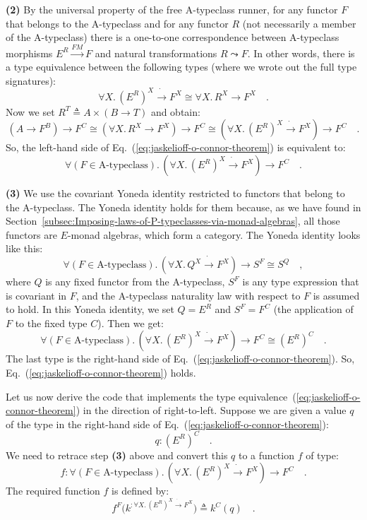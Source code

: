 \textbf{(2)} By the universal property of the free A-typeclass runner,
for any functor $F$ that belongs to the A-typeclass and for any functor
$R$ (not necessarily a member of the A-typeclass) there is a one-to-one
correspondence between A-typeclass morphisms $E^{R}\overset{FM}{\rightarrow}F$
and natural transformations $R\leadsto F$. In other words, there
is a type equivalence between the following types (where we wrote
out the full type signatures): 
\[
\forall X.\,(E^{R})^{X}\dot{\rightarrow}F^{X}\cong\forall X.\,R^{X}\rightarrow F^{X}\quad.
\]
Now we set $R^{T}\triangleq A\times(B\rightarrow T)$ and obtain:
\[
(A\rightarrow F^{B})\rightarrow F^{C}\cong(\forall X.\,R^{X}\rightarrow F^{X})\rightarrow F^{C}\cong(\forall X.\,(E^{R})^{X}\dot{\rightarrow}F^{X})\rightarrow F^{C}\quad.
\]
So, the left-hand side of Eq.~(\ref{eq:jaskelioff-o-connor-theorem})
is equivalent to:
\[
\forall(F\in\text{A-typeclass}).\,(\forall X.\,(E^{R})^{X}\dot{\rightarrow}F^{X})\rightarrow F^{C}\quad.
\]

\textbf{(3)} We use the covariant Yoneda identity restricted to functors
that belong to the A-typeclass. The Yoneda identity holds for them
because, as we have found in Section~\ref{subsec:Imposing-laws-of-P-typeclasses-via-monad-algebras},
all those functors are $E$-monad algebras, which form a category.
The Yoneda identity looks like this:
\[
\forall(F\in\text{A-typeclass}).\,(\forall X.\,Q^{X}\dot{\rightarrow}F^{X})\rightarrow S^{F}\cong S^{Q}\quad,
\]
where $Q$ is any fixed functor from the A-typeclass, $S^{F}$ is
any type expression that is covariant in $F$, and the A-typeclass
naturality law with respect to $F$ is assumed to hold. In this Yoneda
identity, we set $Q=E^{R}$ and $S^{F}=F^{C}$ (the application of
$F$ to the fixed type $C$). Then we get:
\[
\forall(F\in\text{A-typeclass}).\,(\forall X.\,(E^{R})^{X}\dot{\rightarrow}F^{X})\rightarrow F^{C}\cong(E^{R})^{C}\quad.
\]
The last type is the right-hand side of Eq.~(\ref{eq:jaskelioff-o-connor-theorem}).
So, Eq.~(\ref{eq:jaskelioff-o-connor-theorem}) holds.

Let us now derive the code that implements the type equivalence~(\ref{eq:jaskelioff-o-connor-theorem})
in the direction of right-to-left. Suppose we are given a value $q$
of the type in the right-hand side of Eq.~(\ref{eq:jaskelioff-o-connor-theorem}):
\[
q:(E^{R})^{C}\quad.
\]
We need to retrace step \textbf{(3)} above and convert this $q$ to
a function $f$ of type:
\[
f:\forall(F\in\text{A-typeclass}).\,(\forall X.\,(E^{R})^{X}\dot{\rightarrow}F^{X})\rightarrow F^{C}\quad.
\]
The required function $f$ is defined by:
\[
f^{F}\big(k^{:\forall X.\,(E^{R})^{X}\dot{\rightarrow}F^{X}}\big)\triangleq k^{C}(q)\quad.
\]

